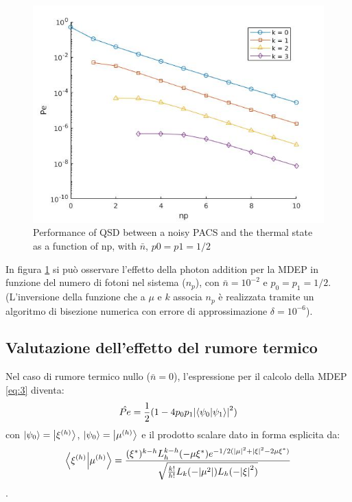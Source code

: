 \documentclass[a4paper,11pt]{article}
\begin{document}
        \begin{figure}[ht]
            \includegraphics[width=1\textwidth]{4a.jpg}
            \caption{Performance of QSD between a noisy PACS and the thermal 
            state as a function of np, with $\bar{n}$, $p0=p1=1/2$}
            \label{fig:1}
        \end{figure}

        In figura \ref{fig:1} si può osservare l'effetto della \foreignlanguage{english}
        {photon addition} per la MDEP in funzione del numero di fotoni nel sistema
        ($n_p$), con $\bar{n}=10^{-2}$ e $p_0=p_1=1/2$.
        (L'inversione della funzione che a $\mu$ e $k$ associa $n_p$ è realizzata tramite 
        un algoritmo di bisezione numerica con errore di approssimazione $\delta=10^{-6}$).

        \subsection{Valutazione dell'effetto del rumore termico}
        Nel caso di rumore termico nullo ($\bar{n}=0$), l'espressione per il calcolo della
        MDEP \ref{eq:3} diventa:
        \begin{equation}
            \hat{Pe}=\frac{1}{2}(1-4 p_0 p_1\absolutevalue{\braket{\psi_0}{\psi_1}}^2)
        \end{equation}
        con 
        $\ket{\psi_0}=\ket{\xi^{(h)}}$,
        $\ket{\psi_0}=\ket{\mu^{(h)}}$
        e il prodotto scalare dato in forma esplicita da:
        \begin{equation}
            \braket{\xi^{(h)}}{\mu^{(h)}}=\frac{(\xi^*)^{k-h}L_h^{k-h}(-\mu\xi^*)
            e^{-1/2(\absolutevalue{\mu}^2+\absolutevalue{\xi}^2-2\mu\xi^*)}}
            {\sqrt{\frac{k!}{h!}L_k(-\absolutevalue{\mu^2})L_h(-\absolutevalue{\xi}^2)}}
        \end{equation}.
\end{document}
